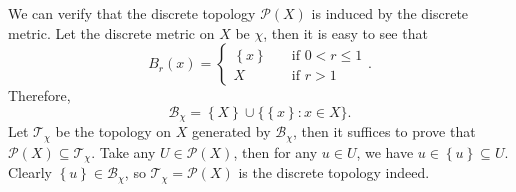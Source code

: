 \documentclass[math, code]{amznotes}
\theoremstyle{remark}
\begin{document}
We can verify that the discrete topology $\mathcal{P}\left(X\right)$ is induced by the discrete metric. Let the discrete metric on $X$ be $\chi$, then it is easy to see that 
\begin{equation*}
    B_r\left(x\right) = \begin{cases}
        \left\{x\right\} & \quad\textrm{if } 0 < r \leq 1 \\
        X & \quad\textrm{if } r > 1
    \end{cases}.
\end{equation*}
Therefore, 
\begin{equation*}
    \mathcal{B}_{\chi} = \left\{X\right\} \cup \bigl\{\left\{x\right\} \colon x \in X\bigr\}.
\end{equation*}
Let $\mathcal{T}_{\chi}$ be the topology on $X$ generated by $\mathcal{B}_{\chi}$, then it suffices to prove that $\mathcal{P}\left(X\right) \subseteq \mathcal{T}_{\chi}$. Take any $U \in \mathcal{P}\left(X\right)$, then for any $u \in U$, we have $u \in \left\{u\right\} \subseteq U$. Clearly $\left\{u\right\} \in \mathcal{B}_{\chi}$, so $\mathcal{T}_{\chi} = \mathcal{P}\left(X\right)$ is the discrete topology indeed.
\end{document}
